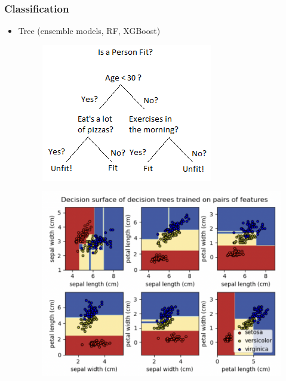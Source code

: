 \begin{frame}\frametitle{Classification}
   \begin{itemize}
      \item Tree (ensemble models, RF, XGBoost)
      \begin{figure}[H]
         \includegraphics[scale=.35]{../images/illustrations/model_tree.png}
      \end{figure}
      \begin{figure}[H]
         \includegraphics[scale=.35]{../images/illustrations/model_tree_example.png}
      \end{figure}
   \end{itemize}
\end{frame}



